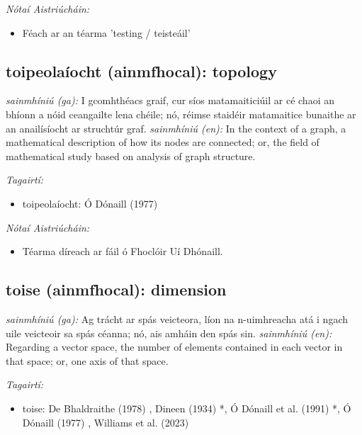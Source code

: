 \documentclass{article}
\begin{document}
 \noindent \textit{Nótaí Aistriúcháin:}
\begin{itemize}
	\item Féach ar an téarma 'testing / teisteáil'
\end{itemize}


\subsection*{toipeolaíocht (ainmfhocal): topology} 
 \noindent \textit{sainmhíniú (ga):} I gcomhthéacs graif, cur síos matamaiticiúil ar cé chaoi an bhíonn a nóid ceangailte lena chéile; nó, réimse staidéir matamaitice bunaithe ar an anailísíocht ar struchtúr graf.
\newline\newline
 \noindent \textit{sainmhíniú (en):} In the context of a graph, a mathematical description of how its nodes are connected; or, the field of mathematical study based on analysis of graph structure.
\newline

 \noindent \textit{Tagairtí:}
\begin{itemize}
	\item toipeolaíocht: Ó Dónaill (1977) \cite{odonaill}
\end{itemize}

 \noindent \textit{Nótaí Aistriúcháin:}
\begin{itemize}
	\item Téarma díreach ar fáil ó Fhoclóir Uí Dhónaill.
\end{itemize}


\subsection*{toise (ainmfhocal): dimension} 
 \noindent \textit{sainmhíniú (ga):} Ag trácht ar spás veicteora, líon na n-uimhreacha atá i ngach uile veicteoir sa spás céanna; nó, ais amháin den spás sin.
\newline\newline
 \noindent \textit{sainmhíniú (en):} Regarding a vector space, the number of elements contained in each vector in that space; or, one axis of that space.
\newline

 \noindent \textit{Tagairtí:}
\begin{itemize}
	\item toise: De Bhaldraithe (1978) \cite{de-bhaldraithe}, Dineen (1934) \cite{dineen}*, Ó Dónaill et al. (1991) \cite{focloir-beag}*, Ó Dónaill (1977) \cite{odonaill}, Williams et al. (2023) \cite{storchiste}
\end{itemize}
\end{document}
